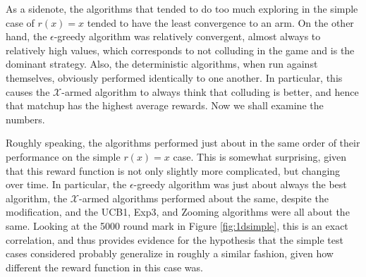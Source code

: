 As a sidenote, the algorithms that tended to do too much exploring in the
simple case of $r(x)=x$ tended to have the least convergence to an arm.
On the other hand, the $\epsilon$-greedy algorithm was relatively
convergent, almost always to relatively high values, which corresponds to
not colluding in the game and is the dominant strategy.  Also, the
deterministic algorithms, when run against themselves, obviously performed
identically to one another.  In particular, this causes the
$\mathcal{X}$-armed algorithm to always think that colluding is better, and
hence that matchup has the highest average rewards.
Now we shall examine the numbers.

Roughly speaking, the algorithms performed just about in the same order of
their performance on the simple $r(x)=x$ case.  This is somewhat surprising,
given that this reward function is not only slightly more complicated, but
changing over time.  In particular, the $\epsilon$-greedy algorithm was
just about always the best algorithm, the $\mathcal{X}$-armed algorithms
performed about the same, despite the modification, and the UCB1, Exp3,
and Zooming algorithms were all about the same.  Looking at the 5000
round mark in Figure \ref{fig:1dsimple}, this is an exact correlation, and
thus provides evidence for the hypothesis that the simple test cases
considered probably generalize in roughly a similar fashion, given how
different the reward function in this case was.

